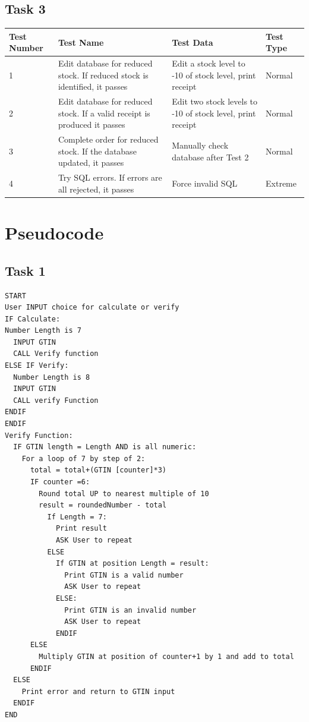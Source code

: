 \documentclass[a4paper]{article}
\begin{document}
\subsection{Task 3}
\begin{center}
\begin{tabular}{ | m{4em} | m{19em} | m{10em} | m{5em} | }
  \hline
  Test Number & Test Name & Test Data & Test Type	\\ [0.5ex] 
  \hline\hline
  1 & Edit database for reduced stock. If reduced stock is identified, it passes & Edit a stock level to -10 of stock level, print receipt & Normal \\
  \hline
  2 & Edit database for reduced stock. If a valid receipt is produced it passes & Edit two stock levels to -10 of stock level, print receipt & Normal \\
  \hline
  3 & Complete order for reduced stock. If the database updated, it passes & Manually check database after Test 2 & Normal \\
  \hline
  4 & Try SQL errors. If errors are all rejected, it passes & Force invalid SQL & Extreme \\
  \hline
\end{tabular}
\end{center}

\pagebreak

\section{Pseudocode}
\subsection{Task 1}
\begin{lstlisting}
START
User INPUT choice for calculate or verify	
IF Calculate:
Number Length is 7
  INPUT GTIN
  CALL Verify function
ELSE IF Verify:
  Number Length is 8
  INPUT GTIN
  CALL verify Function
ENDIF
ENDIF
Verify Function:
  IF GTIN length = Length AND is all numeric:
    For a loop of 7 by step of 2:
      total = total+(GTIN [counter]*3)
      IF counter =6:
        Round total UP to nearest multiple of 10
        result = roundedNumber - total
          If Length = 7:
            Print result
            ASK User to repeat
          ELSE
            If GTIN at position Length = result:
              Print GTIN is a valid number
              ASK User to repeat
            ELSE:
              Print GTIN is an invalid number
              ASK User to repeat
            ENDIF
      ELSE
        Multiply GTIN at position of counter+1 by 1 and add to total
      ENDIF
  ELSE
    Print error and return to GTIN input
  ENDIF
END
\end{lstlisting}
\pagebreak
\end{document}
